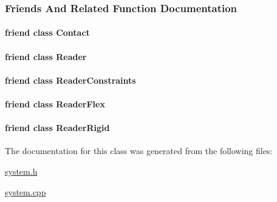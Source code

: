 \subsubsection{Friends And Related Function Documentation}
\hypertarget{classmknix_1_1_system_a76d4b1c8c6040df20040808941b7e764}{
\paragraph[{Contact}]{\setlength{\rightskip}{0pt plus 5cm}friend class {\bf Contact}\hspace{0.3cm}{\ttfamily [friend]}}}\label{classmknix_1_1_system_a76d4b1c8c6040df20040808941b7e764}
\hypertarget{classmknix_1_1_system_a35cb182752752c74a30050705acc3c06}{
\paragraph[{Reader}]{\setlength{\rightskip}{0pt plus 5cm}friend class {\bf Reader}\hspace{0.3cm}{\ttfamily [friend]}}}\label{classmknix_1_1_system_a35cb182752752c74a30050705acc3c06}
\hypertarget{classmknix_1_1_system_ae164a82e4890f6fbab13f95a18656edf}{
\paragraph[{Reader\-Constraints}]{\setlength{\rightskip}{0pt plus 5cm}friend class {\bf Reader\-Constraints}\hspace{0.3cm}{\ttfamily [friend]}}}\label{classmknix_1_1_system_ae164a82e4890f6fbab13f95a18656edf}
\hypertarget{classmknix_1_1_system_a1150cceac3e81192653459c61f428621}{
\paragraph[{Reader\-Flex}]{\setlength{\rightskip}{0pt plus 5cm}friend class {\bf Reader\-Flex}\hspace{0.3cm}{\ttfamily [friend]}}}\label{classmknix_1_1_system_a1150cceac3e81192653459c61f428621}
\hypertarget{classmknix_1_1_system_a6a45b3f2d8b6c9e516334b46caf0cbb7}{
\paragraph[{Reader\-Rigid}]{\setlength{\rightskip}{0pt plus 5cm}friend class {\bf Reader\-Rigid}\hspace{0.3cm}{\ttfamily [friend]}}}\label{classmknix_1_1_system_a6a45b3f2d8b6c9e516334b46caf0cbb7}


The documentation for this class was generated from the following files\-:\begin{DoxyCompactItemize}
\item 
\hyperlink{system_8h}{system.\-h}\item 
\hyperlink{system_8cpp}{system.\-cpp}\end{DoxyCompactItemize}
